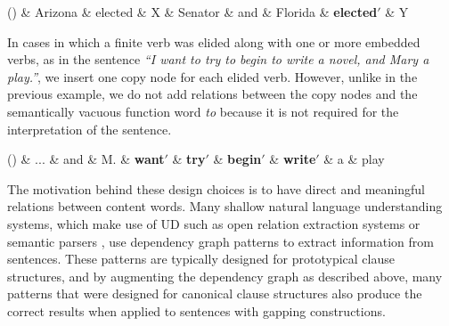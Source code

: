 \documentclass[11pt]{article}
\newenvironment{myquote}%
  {\list{}{\leftmargin=0.0in\rightmargin=0.0in}\item[]}%
  {\endlist}
\newcounter{excounter}
\begin{document}
\begin{myquote}
\label{ex:en-gap-8}
\footnotesize
  \begin{dependency}[edge unit distance=2.5ex]
    \begin{deptext}[column sep=-0.05cm]
      (\theexcounter) \& Arizona \& elected \& X \& Senator \& and \& Florida \& \textbf{elected$'$} \& Y \\
    \end{deptext}
  \end{dependency}
\end{myquote}
In cases in which a finite verb was elided along with one or more embedded verbs, as in the sentence \textit{``I want to try to begin to write a novel, and Mary a play.''}, we insert one copy node for each elided verb. However, unlike in the previous example, we do not add relations between the copy nodes and the semantically vacuous function word \textit{to} because it is not required for the interpretation of the sentence.

\begin{myquote}
\label{ex:en-gap-9}
\footnotesize
  \begin{dependency}
    \begin{deptext}[column sep=0.1cm]
      (\theexcounter) \& ... \& and \& M. \& \textbf{want$'$} \& \textbf{try$'$} \& \textbf{begin$'$} \& \textbf{write$'$} \& a \& play \\
    \end{deptext}
  \end{dependency}
\end{myquote}

The motivation behind these design choices is to have direct and meaningful relations between content words. Many shallow natural language understanding systems, which make use of UD such as open relation extraction systems \cite{Mausam2012,Angeli2015} or semantic parsers \cite{Andreas2016,Reddy2017}, use dependency graph patterns to extract information from sentences. These patterns are typically designed for prototypical clause structures, and by augmenting the dependency graph as described above, many patterns that were designed for canonical clause structures also produce the correct results when applied to sentences with gapping constructions.
\end{document}
